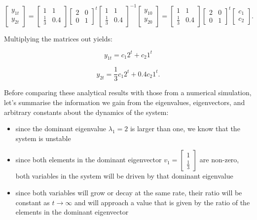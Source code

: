 \documentclass[
  letterpaper,
  DIV=11,
  numbers=noendperiod]{scrreprt}
\begin{document}
\[
\begin{bmatrix} y_{1t} \\ y_{2t} \end{bmatrix}= \begin{bmatrix} 1 & 1 \\ \frac{1}{3} & 0.4 \end{bmatrix} \begin{bmatrix} 2 & 0 \\ 0 & 1 \end{bmatrix}^t \begin{bmatrix} 1 & 1 \\ \frac{1}{3} & 0.4 \end{bmatrix}^{-1} \begin{bmatrix} y_{10} \\ y_{20} \end{bmatrix} = \begin{bmatrix} 1 & 1 \\ \frac{1}{3} & 0.4 \end{bmatrix} \begin{bmatrix} 2 & 0 \\ 0 & 1 \end{bmatrix}^t \begin{bmatrix} c_{1} \\ c_{2} \end{bmatrix}.
\]

Multiplying the matrices out yields:

\[
 y_{1t} = c_{1}2^t + c_{2}1^t
\]

\[
 y_{2t} = \frac{1}{3}c_{1}2^t + 0.4c_{2}1^t. 
\]

Before comparing these analytical results with those from a numerical
simulation, let's summarise the information we gain from the
eigenvalues, eigenvectors, and arbitrary constants about the dynamics of
the system:

\begin{itemize}
\item
  since the dominant eigenvalue \(\lambda_1=2\) is larger than one, we
  know that the system is unstable
\item
  since both elements in the dominant eigenvector
  \(v_1=\begin{bmatrix} 1 \\ \frac{1}{3} \end{bmatrix}\) are non-zero,
  both variables in the system will be driven by that dominant
  eigenvalue
\item
  since both variables will grow or decay at the same rate, their ratio
  will be constant as \(t \rightarrow \infty\) and will approach a value
  that is given by the ratio of the elements in the dominant eigenvector
\end{itemize}
\end{document}
